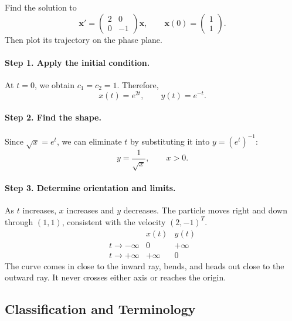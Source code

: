 \documentclass[11pt,letterpaper]{article}
\newcommand{\phaseaxes}{%
    \draw[->,gray](-3.25,0)--(3.45,0)node[right]{$x$};
    \draw[->,gray](0,-3.25)--(0,3.45)node[above]{$y$};
}
\newcommand{\saddlerays}{%
    \draw[outward](-3.1,0)--(3.1,0);
    \draw[inward](0,-3.1)--(0,3.1);
    \foreach \s in {-1,1}{
        \draw[->,outward](.9*\s,0)--(1.7*\s,0);
        \draw[->,inward](0,1.7*\s)--(0,.9*\s);
    }
    \fill(0,0)circle(2pt);
}
\begin{document}
\begin{example}[3]{
Find the solution to 
\[
\mathbf{x}'=\begin{pmatrix}2&0\\0&-1\end{pmatrix}\mathbf{x},\qquad
\mathbf{x}(0)=\begin{pmatrix}1\\1\end{pmatrix}.
\]
Then plot its trajectory on the phase plane.
}
\paragraph{Step 1. Apply the initial condition.}
At $t=0$, we obtain $c_1=c_2=1$. Therefore,
\[
x(t)=e^{2t},\qquad y(t)=e^{-t}.
\]
\paragraph{Step 2. Find the shape.}
Since $\sqrt{x}=e^t$, we can eliminate $t$ by substituting it into  $y=(e^{t})^{-1}$:
\[
\boxed{y=\frac{1}{\sqrt{x}},\qquad x>0.}
\]
\paragraph{Step 3. Determine orientation and limits.}
As $t$ increases, $x$ increases and $y$ decreases. The particle moves
right and down through $(1,1)$, consistent with the velocity $(2,-1)^T$.
\[
\begin{array}{c|cc}
 & x(t)&y(t)\\\hline
 t\to-\infty&0&+\infty\\
 t\to+\infty&+\infty&0
\end{array}
\]
The curve comes in close to the inward ray, bends, and heads out close to
the outward ray. It never crosses either axis or reaches the origin.
\begin{center}
\end{center}
\end{example}

\subsection{Classification and Terminology}
\end{document}
